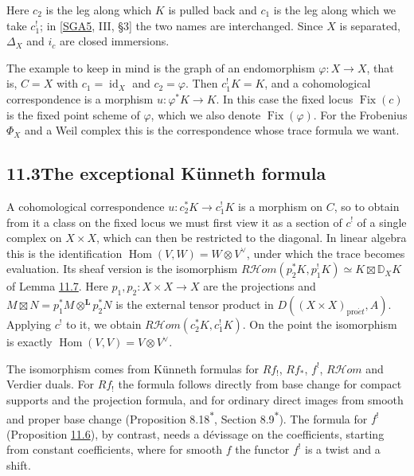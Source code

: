 \documentclass[11pt]{article}
\newcommand{\bpout}[1]{#1\textsuperscript{\hyperlink{bp-outside}{\ensuremath{\ast}}}}
\providecommand{\Fix}{}\renewcommand{\Fix}{\operatorname{Fix}}
\providecommand{\cHom}{}\renewcommand{\cHom}{R\mathcal{H}\!om}
\begin{document}
\label{bp16}%
Here \(c_2\) is the leg along which \(K\) is pulled back and \(c_1\) is the leg along which we take \(c_1^!\); in [\hyperref[bp57]{SGA5}, III, §3] the two names are interchanged. Since \(X\) is separated, \(\Delta_X\) and \(i_c\) are closed immersions.

The example to keep in mind is the graph of an endomorphism \(\varphi:X\to X\), that is, \(C=X\) with \(c_1=\operatorname{id}_X\) and \(c_2=\varphi\). Then \(c_1^!K=K\), and a cohomological correspondence is a morphism \(u:\varphi^*K\to K\). In this case the fixed locus \(\Fix(c)\) is the fixed point scheme of \(\varphi\), which we also denote \(\Fix(\varphi)\). For the Frobenius \(\Phi_X\) and a Weil complex this is the correspondence whose trace formula we want.


\subsection*{\texorpdfstring{11.3\quad The exceptional Künneth formula}{11.3 The exceptional Künneth formula}}
\label{bp17}%
\label{bp18}%
A cohomological correspondence \(u:c_2^*K\to c_1^!K\) is a morphism on \(C\), so to obtain from it a class on the fixed locus we must first view it as a section of \(c^!\) of a single complex on \(X\times X\), which can then be restricted to the diagonal. In linear algebra this is the identification \(\operatorname{Hom}(V,W)=W\otimes V^\vee\), under which the trace becomes evaluation. Its sheaf version is the isomorphism \(\cHom(p_2^*K,p_1^!K)\simeq K\boxtimes\mathbb D_XK\) of Lemma \hyperref[bp22]{11.7}. Here \(p_1,p_2:X\times X\to X\) are the projections and \(M\boxtimes N=p_1^*M\otimes^{\mathbf L} p_2^*N\) is the external tensor product in \(D((X\times X)_{\mathrm{pro}\acute{e}t},A)\). Applying \(c^!\) to it, we obtain \(\cHom(c_2^*K,c_1^!K)\). On the point the isomorphism is exactly \(\operatorname{Hom}(V,V)=V\otimes V^\vee\).

The isomorphism comes from Künneth formulas for \(Rf_!\), \(Rf_*\), \(f^!\), \(\cHom\) and Verdier duals. For \(Rf_!\) the formula follows directly from base change for compact supports and the projection formula, and for ordinary direct images from smooth and proper base change (Proposition \bpout{8.18}, Section \bpout{8.9}). The formula for \(f^!\) (Proposition \hyperref[bp19]{11.6}), by contrast, needs a dévissage on the coefficients, starting from constant coefficients, where for smooth \(f\) the functor \(f^!\) is a twist and a shift.
\end{document}

